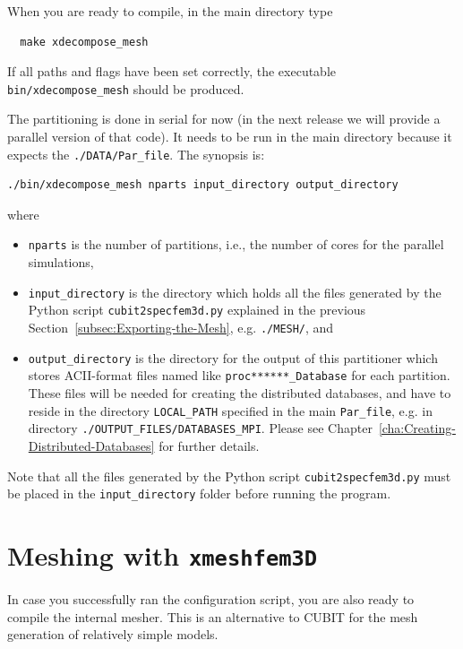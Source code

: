 \noindent
When you are ready to compile, in the main directory type
{\small
\begin{verbatim}
  make xdecompose_mesh
\end{verbatim}
}
\noindent
If all paths and flags have been set correctly, the executable \texttt{bin/xdecompose\_mesh}
should be produced.

The partitioning is done in serial for now (in the next release we
will provide a parallel version of that code). It needs to be run in the main directory because it expects the \texttt{./DATA/Par\_file}.
The synopsis is:
%
\begin{verbatim}
./bin/xdecompose_mesh nparts input_directory output_directory
\end{verbatim}
%
\noindent
where
\begin{itemize}
\item \texttt{nparts} is the number of partitions, i.e., the number of cores
for the parallel simulations,
\item \texttt{input\_directory} is the directory which holds all the files
generated by the Python script \texttt{cubit2specfem3d.py} explained
in the previous Section~\ref{subsec:Exporting-the-Mesh}, e.g. \texttt{./MESH/},
and
\item \texttt{output\_directory} is the directory for the output of this
partitioner which stores ACII-format files named like \texttt{proc{*}{*}{*}{*}{*}{*}\_Database}
for each partition. These files will be needed for creating the distributed
databases, and have to reside in the directory \texttt{LOCAL\_PATH}
specified in the main \texttt{Par\_file}, e.g. in directory \texttt{./OUTPUT\_FILES/DATABASES\_MPI}.
Please see Chapter~\ref{cha:Creating-Distributed-Databases} for
further details.
\end{itemize}
Note that all the files generated by the Python script \texttt{cubit2specfem3d.py}
must be placed in the \texttt{input\_directory} folder before running
the program.


\section{Meshing with \texttt{xmeshfem3D}}\label{cha:Running-the-Mesher-Meshfem3D}

In case you successfully ran the configuration script, you are also
ready to compile the internal mesher. This is an alternative to CUBIT
for the mesh generation of relatively simple models.\\


